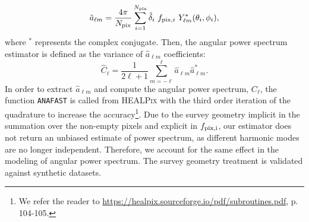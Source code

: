 \begin{equation}
        \hat{a}_{\ell m} = \frac{4\pi}{N_{{\rm pix}}} \sum_{i=1}^{N_{{\rm pix}}}  \hat{\delta}_{i}~f_{{\rm pix}, i}~ Y^{*}_{\ell m}(\theta_{i}, \phi_{i}),
\end{equation}
where $^{*}$ represents the complex conjugate. Then, the angular power spectrum estimator is defined as the variance of  $\hat{a}_{\ell m}$  coefficients:
\begin{equation}\label{eq:pusedocell}
        \hat{C}_{\ell} = \frac{1}{2\ell +1} \sum_{m=-\ell}^{\ell} \hat{a}_{\ell m} \hat{a}^{*}_{\ell m}.
\end{equation}
In order to extract $\hat{a}_{\ell m}$  and compute the angular power spectrum, $C_{\ell}$, the function \texttt{ANAFAST} is called from \textsc{HEALPix} \citep{gorski2005healpix} with the third order iteration of the quadrature to increase the accuracy\footnote{We refer the reader to \url{https://healpix.sourceforge.io/pdf/subroutines.pdf}, p. 104-105.}. Due to the survey geometry implicit in the summation over the non-empty pixels and explicit in $f_{\rm pix, i}$, our estimator does not return an unbiased estimate of power spectrum, as different harmonic modes are no longer independent. Therefore, we account for the same effect in the modeling of angular power spectrum. The survey geometry treatment is validated against synthetic datasets.


